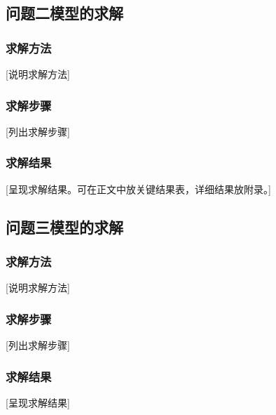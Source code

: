 \subsection{问题二模型的求解}

\subsubsection{求解方法}

[说明求解方法]

\subsubsection{求解步骤}

[列出求解步骤]

\subsubsection{求解结果}

[呈现求解结果。可在正文中放关键结果表，详细结果放附录。]


\subsection{问题三模型的求解}

\subsubsection{求解方法}

[说明求解方法]

\subsubsection{求解步骤}

[列出求解步骤]

\subsubsection{求解结果}

[呈现求解结果]
